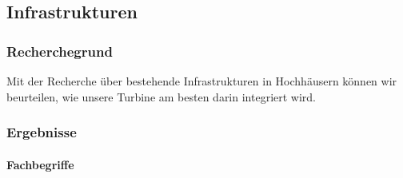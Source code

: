 \subsection{Infrastrukturen}

\subsubsection{Recherchegrund}

Mit der Recherche über bestehende Infrastrukturen in Hochhäusern können wir beurteilen, wie unsere Turbine am besten darin integriert wird.



\subsubsection{Ergebnisse}

\paragraph{Fachbegriffe}



